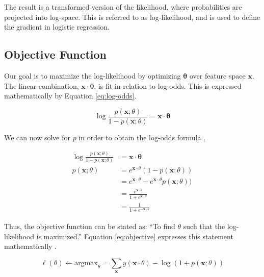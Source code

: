 \documentclass[letterpaper]{article} %
\begin{document}
The result is a transformed version of the likelihood,
where probabilities are projected into log-space.
This is referred to as log-likelihood, and is used to define the gradient
in logistic regression.

\subsection{Objective Function}
Our goal is to maximize the log-likelihood
by optimizing $\mathbf{\theta}$ over feature space $\mathbf{x}$.
The linear combination, $\mathbf{x\cdot\theta}$,
is fit in relation to log-odds.
This is expressed mathematically by
Equation \ref{eq:log-odds}.

\begin{equation}
\label{eq:log-odds}
\log \frac{p(\mathbf{x};\theta)}{1 - p(\mathbf{x};\theta)} = \mathbf{x \cdot \theta}
\end{equation}

We can now solve for $p$ in order to obtain the log-odds formula
\cite{data_analysis}.

\begin{equation}
\begin{split}
\label{eq:likelihood}
\log \frac{p(\mathbf{x};\theta)}{1 - p(\mathbf{x};\theta)} &= \mathbf{x \cdot \theta} \\
p(\mathbf{x};\theta) &= e^{\mathbf{x} \cdot \theta}(1 - p(\mathbf{x};\theta)) \\
&= e^{\mathbf{x} \cdot \theta} - e^{\mathbf{x} \cdot \theta}p(\mathbf{x};\theta)) \\
&= \frac{e^{\mathbf{x} \cdot \theta}}{1 + e^{\mathbf{x} \cdot \theta}} \\
&= \frac{1}{1 + e^{-\mathbf{x} \cdot \theta}}
\end{split}
\end{equation}

Thus, the objective function can be stated as: ``To find $\theta$
such that the log-likelihood is maximized.''
Equation \ref{eq:objective} expresses this statement mathematically \cite{data_analysis}.

\begin{equation}
\label{eq:objective}
\ell(\theta) \leftarrow \text{argmax}_{\theta} = \sum_{\mathbf{x}}y(\mathbf{x}\cdot\theta) - \log(1 + p(\mathbf{x};\theta))
\end{equation}
\end{document}
